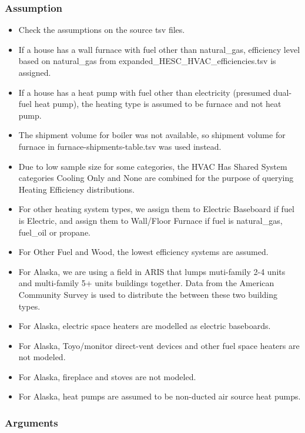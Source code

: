 \subsubsection{Assumption}\label{assumption-42}

\begin{itemize}
 
\item
  Check the assumptions on the source tsv files.
\item
  If a house has a wall furnace with fuel other than natural\_gas,
  efficiency level based on natural\_gas from
  expanded\_HESC\_HVAC\_efficiencies.tsv is assigned.
\item
  If a house has a heat pump with fuel other than electricity (presumed
  dual-fuel heat pump), the heating type is assumed to be furnace and
  not heat pump.
\item
  The shipment volume for boiler was not available, so shipment volume
  for furnace in furnace-shipments-table.tsv was used instead.
\item
  Due to low sample size for some categories, the HVAC Has Shared System
  categories \textquotesingle Cooling Only\textquotesingle{} and
  \textquotesingle None\textquotesingle{} are combined for the purpose
  of querying Heating Efficiency distributions.
\item
  For \textquotesingle other\textquotesingle{} heating system types, we
  assign them to Electric Baseboard if fuel is Electric, and assign them
  to Wall/Floor Furnace if fuel is natural\_gas, fuel\_oil or propane.
\item
  For Other Fuel and Wood, the lowest efficiency systems are assumed.
\item
  For Alaska, we are using a field in ARIS that lumps muti-family 2-4
  units and multi-family 5+ units buildings together. Data from the
  American Community Survey is used to distribute the between these two
  building types.
\item
  For Alaska, electric space heaters are modelled as electric
  baseboards.
\item
  For Alaska, Toyo/monitor direct-vent devices and other fuel space
  heaters are not modeled.
\item
  For Alaska, fireplace and stoves are not modeled.
\item
  For Alaska, heat pumps are assumed to be non-ducted air source heat
  pumps.
\end{itemize}

\subsubsection{Arguments}\label{arguments-45}


